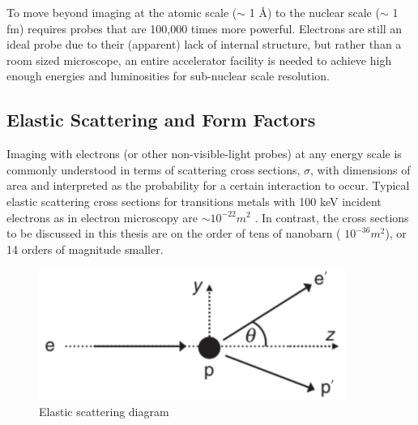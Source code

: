         To move beyond imaging at the atomic scale ($\sim$ 1 \AA) to the nuclear scale ($\sim$ 1 fm) requires probes that are 100,000 times more powerful. Electrons are still an ideal probe due to their (apparent) lack of internal structure, but rather than a room sized microscope, an entire accelerator facility is needed to achieve high enough energies and luminosities for sub-nuclear scale resolution. 
        


    \subsection{Elastic Scattering and Form Factors}

        Imaging with electrons (or other non-visible-light probes) at any energy scale is commonly understood in terms of scattering cross sections, $\sigma$, with dimensions of area and interpreted as the probability for a certain interaction to occur. Typical elastic scattering cross sections for transitions metals with 100 keV incident electrons as in electron microscopy are $\sim 10^{-22} m^2$ \parencite{Williams2009TransmissionMicroscopy}. In contrast, the cross sections to be discussed in this thesis are on the order of tens of nanobarn ( $10^{-36} m^2$), or 14 orders of magnitude smaller. 
        

        \begin{figure}[H]
            \centering
            \includegraphics[width=10cm]{Chapters/Ch1-Intro/Ch1-Sec1-Background/pics/elastic-ep/kine-e-2.PNG}
            \caption{Elastic scattering diagram}
        \end{figure}
            
